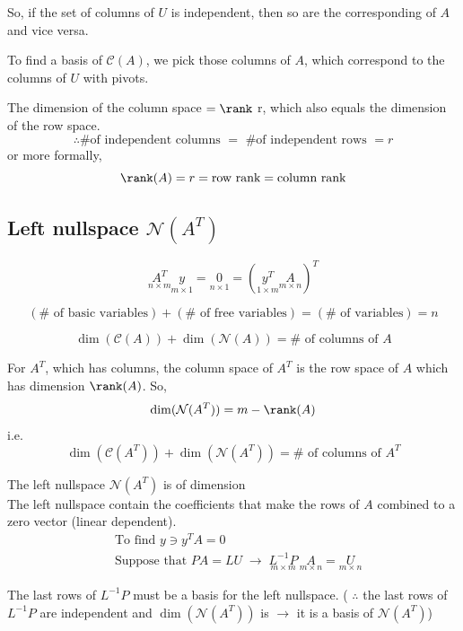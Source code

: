 \vspace{1em}

So, if the set of columns of $U$ is independent, then so are the corresponding  of $A$ and vice versa. 

\vspace{1em}

To find a basis of $\mathcal{C}(A)$, we pick those columns of $A$, which correspond to the columns of $U$ with pivots.

\begin{proposition}[2O]
    The dimension of the column space $ = \rank$ r, which also equals the dimension of the row space.
    \[
        \therefore \text{\# of independent columns $=$ \# of independent rows $= r$}
    \]
    or more formally,
    \[
        \rank(A) = r = \text{row rank} = \text{column rank}
    \]
\end{proposition}

\newpage

\subsection{Left nullspace $\mathcal{N}(A^T)$}

\[
\underset{n\times m}{A^T} \underset{m \times 1}{y} = \underset{n \times 1}{0} = (\underset{1 \times m}{y^T}\underset{m \times n}{A})^T
\]

\[
(\# \text{ of basic variables}) + (\# \text{ of free variables}) = (\# \text{ of variables}) = n
\]

\[
\boxed{\dim(\mathcal{C}(A)) + \dim(\mathcal{N}(A)) = \# \text{ of columns of } A}
\]

For $A^T$, which has  columns, the column space of $A^T$ is the row space of $A$ which has dimension $\rank(A)$. So,
\[
\dim(\mathcal{N}(A^T)) = m - \rank(A)
\]
i.e.
\[
\boxed{\dim(\mathcal{C}(A^T)) + \dim(\mathcal{N}(A^T)) = \# \text{ of columns of } A^T}
\]

\begin{proposition}[2P]
    The left nullspace $\mathcal{N}(A^T)$ is of dimension  \\
    The left nullspace contain the coefficients that make the rows of $A$ combined to a zero vector (linear dependent).
    \begin{align*}
    &\text{To find } y \ni y^T A = 0 \\[6pt]
    &\text{Suppose that } P A = L U 
    \;\longrightarrow\;
    \underset{m \times m}{\boxed{L^{-1} P}}\, \underset{m \times n}{A} 
    = \underset{m \times n}{U}
    \end{align*}

    The last  rows of $L^{-1}P$ must be a basis for the left nullspace. ( $\therefore$ the last  rows of $L^{-1}P$ are independent and $\dim(\mathcal{N}(A^T))$ is  $\rightarrow$ it is a basis of $\mathcal{N}(A^T)$)
\end{proposition}

